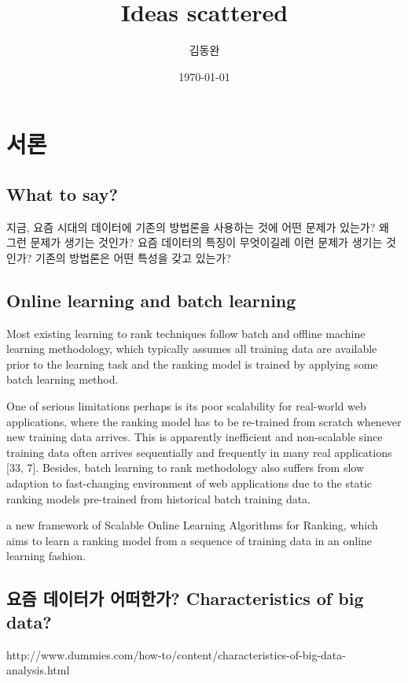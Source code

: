 \documentclass[oneside,b5paper,11pt]{article} %
\title{Ideas scattered}
\author{김동완}
\date{\today}
\begin{document}





\section{서론}
\subsection{What to say?}
지금, 요즘 시대의 데이터에 기존의 방법론을 사용하는 것에 어떤 문제가 있는가? 왜 그런 문제가 생기는 것인가? 요즘 데이터의 특징이 무엇이길레 이런 문제가 생기는 것인가? 기존의 방법론은 어떤 특성을 갖고 있는가?

\subsection{Online learning and batch learning}
Most existing learning to rank techniques follow batch and offline machine learning methodology, which typically assumes all training data are available prior to the learning task and the ranking model is trained by applying some batch learning method.

One of serious limitations perhaps is its poor scalability for real-world web applications, where the ranking model has to be re-trained from scratch whenever new training data arrives. This is apparently inefficient and non-scalable since training data often arrives sequentially and frequently in many real applications [33, 7]. Besides, batch learning to rank methodology also suffers from slow adaption to fast-changing environment of web applications due to the static ranking models pre-trained from historical batch training data.

a new framework of Scalable Online Learning Algorithms for Ranking, which aims to learn a ranking model from a sequence of training data in an online learning fashion.

\subsection{요즘 데이터가 어떠한가? C​haracteristics of big data?}
http://www.dummies.com/how-to/content/characteristics-of-big-data-analysis.html
\end{document}
